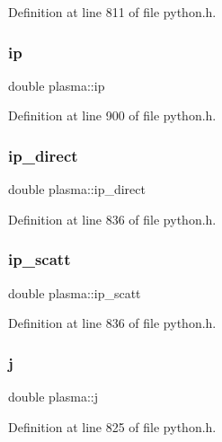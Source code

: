 Definition at line 811 of file python.\+h.

\mbox{\label{structplasma_a1ac56fc73e1242bfa9cbb9bfa04e6d38}} 
\subsubsection{\texorpdfstring{ip}{ip}}
{\footnotesize\ttfamily double plasma\+::ip}



Definition at line 900 of file python.\+h.

\mbox{\label{structplasma_acf74d2b82ce1f94cd72b38b432f68774}} 
\subsubsection{\texorpdfstring{ip\+\_\+direct}{ip\_direct}}
{\footnotesize\ttfamily double plasma\+::ip\+\_\+direct}



Definition at line 836 of file python.\+h.

\mbox{\label{structplasma_ac2985029f1cc2e4bd9a511c7c4ff5db9}} 
\subsubsection{\texorpdfstring{ip\+\_\+scatt}{ip\_scatt}}
{\footnotesize\ttfamily double plasma\+::ip\+\_\+scatt}



Definition at line 836 of file python.\+h.

\mbox{\label{structplasma_a81aa2849c8ad883b8b23ca7a5e7b7c2f}} 
\subsubsection{\texorpdfstring{j}{j}}
{\footnotesize\ttfamily double plasma\+::j}



Definition at line 825 of file python.\+h.

